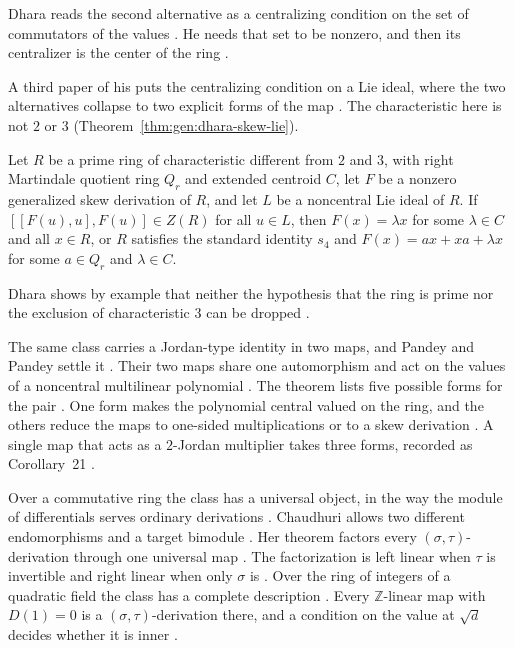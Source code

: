 Dhara reads the second alternative as a centralizing condition on the set of
commutators of the values \cite[Corollary~1.2, p.~3]{Dhara2019Quaest}. He needs
that set to be nonzero, and then its centralizer is the center of the ring
\cite[Corollary~1.2, p.~3]{Dhara2019Quaest}.

A third paper of his puts the centralizing condition on a Lie
ideal, where the two alternatives collapse to two explicit forms of the map
\cite[p.~1]{Dhara2019Ferrara}. The characteristic here is not $2$ or $3$ (Theorem~\ref{thm:gen:dhara-skew-lie}).

\begin{theorem}\label{thm:gen:dhara-skew-lie}
Let $R$ be a prime ring of characteristic different from $2$ and $3$, with right
Martindale quotient ring $Q_{r}$ and extended centroid $C$, let $F$ be a nonzero
generalized skew derivation of $R$, and let $L$ be a noncentral Lie ideal of $R$.
If $[[F(u),u],F(u)]\in Z(R)$ for all $u\in L$, then $F(x)=\lambda x$ for some
$\lambda\in C$ and all $x\in R$, or $R$ satisfies the standard identity $s_{4}$ and
$F(x)=ax+xa+\lambda x$ for some $a\in Q_{r}$ and $\lambda\in C$.
\end{theorem}

Dhara shows by example that neither the hypothesis that the ring is prime nor
the exclusion of characteristic $3$ can be dropped \cite[p.~1]{Dhara2019Ferrara}.

The same class carries a Jordan-type identity in two maps, and Pandey and Pandey
settle it \cite[p.~3]{PandeyPandey2023bGeneralized}. Their two maps share one
automorphism and act on the values of a noncentral multilinear polynomial
\cite[Theorem~6, pp.~3--4]{PandeyPandey2023bGeneralized}. The theorem lists five
possible forms for the pair \cite[Theorem~6, pp.~3--4]{PandeyPandey2023bGeneralized}.
One form makes the polynomial central valued on the ring, and the others reduce
the maps to one-sided multiplications or to a skew derivation
\cite[Theorem~6, pp.~3--4]{PandeyPandey2023bGeneralized}. A single map that acts
as a $2$-Jordan multiplier takes three forms, recorded as Corollary~21
\cite[Corollary~21, p.~18]{PandeyPandey2023bGeneralized}.

Over a commutative ring the class has a universal object, in the way the module
of differentials serves ordinary derivations \cite[p.~3]{Chaudhuri2020SigmaTau}.
Chaudhuri allows two different endomorphisms and a target bimodule
\cite[p.~2]{Chaudhuri2020SigmaTau}. Her theorem factors every
$(\sigma,\tau)$-derivation through one universal map
\cite[Theorem~3.1, p.~3]{Chaudhuri2020SigmaTau}. The factorization is left linear
when $\tau$ is invertible and right linear when only $\sigma$ is
\cite[Theorem~3.1, p.~3]{Chaudhuri2020SigmaTau}. Over the ring of integers of a
quadratic field the class has a complete description
\cite[Theorem~4.2, pp.~6--7]{Chaudhuri2020SigmaTau}. Every $\mathbb{Z}$-linear
map with $D(1)=0$ is a $(\sigma,\tau)$-derivation there, and a condition on the
value at $\sqrt{d}$ decides whether it is inner
\cite[Theorem~4.2, pp.~6--7]{Chaudhuri2020SigmaTau}.

